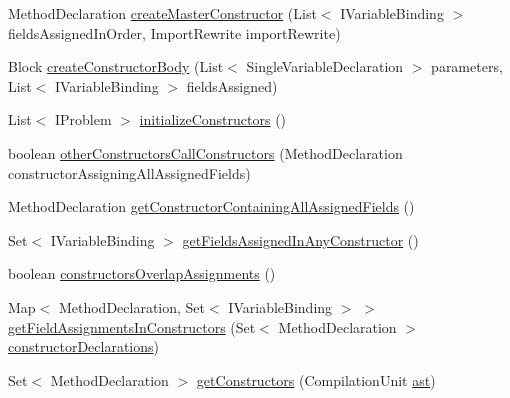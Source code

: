 \begin{DoxyCompactItemize}
\item 
MethodDeclaration \hyperlink{classedu_1_1illinois_1_1canistelCassabanana_1_1RemoveDuplicateCodeInConstructorsRefactoring_a35ec63397f7264bf078a8fc02e1d6842}{createMasterConstructor} (List$<$ IVariableBinding $>$ fieldsAssignedInOrder, ImportRewrite importRewrite)
\item 
Block \hyperlink{classedu_1_1illinois_1_1canistelCassabanana_1_1RemoveDuplicateCodeInConstructorsRefactoring_a49ce4ec62df0a8a7e6ef1fbe340fad40}{createConstructorBody} (List$<$ SingleVariableDeclaration $>$ parameters, List$<$ IVariableBinding $>$ fieldsAssigned)
\item 
List$<$ IProblem $>$ \hyperlink{classedu_1_1illinois_1_1canistelCassabanana_1_1RemoveDuplicateCodeInConstructorsRefactoring_aae064b83438d410e2fa557ba720caf16}{initializeConstructors} ()
\item 
boolean \hyperlink{classedu_1_1illinois_1_1canistelCassabanana_1_1RemoveDuplicateCodeInConstructorsRefactoring_ab246bbd3f947f4f5c10bbdc9611c53b8}{otherConstructorsCallConstructors} (MethodDeclaration constructorAssigningAllAssignedFields)
\item 
MethodDeclaration \hyperlink{classedu_1_1illinois_1_1canistelCassabanana_1_1RemoveDuplicateCodeInConstructorsRefactoring_a2fbc1e6483f590af08091eda9bd63fb5}{getConstructorContainingAllAssignedFields} ()
\item 
Set$<$ IVariableBinding $>$ \hyperlink{classedu_1_1illinois_1_1canistelCassabanana_1_1RemoveDuplicateCodeInConstructorsRefactoring_a0d8043ead99af436fa1b441fe2772a13}{getFieldsAssignedInAnyConstructor} ()
\item 
boolean \hyperlink{classedu_1_1illinois_1_1canistelCassabanana_1_1RemoveDuplicateCodeInConstructorsRefactoring_a7d729e8c3255c6f08bf347f717adf426}{constructorsOverlapAssignments} ()
\item 
Map$<$ MethodDeclaration, Set$<$ IVariableBinding $>$ $>$ \hyperlink{classedu_1_1illinois_1_1canistelCassabanana_1_1RemoveDuplicateCodeInConstructorsRefactoring_aff0617f338fc35633a84737eb3c59501}{getFieldAssignmentsInConstructors} (Set$<$ MethodDeclaration $>$ \hyperlink{classedu_1_1illinois_1_1canistelCassabanana_1_1RemoveDuplicateCodeInConstructorsRefactoring_a39607f363fde072a17c90ed499dd113b}{constructorDeclarations})
\item 
Set$<$ MethodDeclaration $>$ \hyperlink{classedu_1_1illinois_1_1canistelCassabanana_1_1RemoveDuplicateCodeInConstructorsRefactoring_ac128e16af37aecf6dc2f99c72bee4368}{getConstructors} (CompilationUnit \hyperlink{classedu_1_1illinois_1_1canistelCassabanana_1_1RemoveDuplicateCodeInConstructorsRefactoring_ab3b3926a515821596ed383f908c322c1}{ast})
\end{DoxyCompactItemize}
